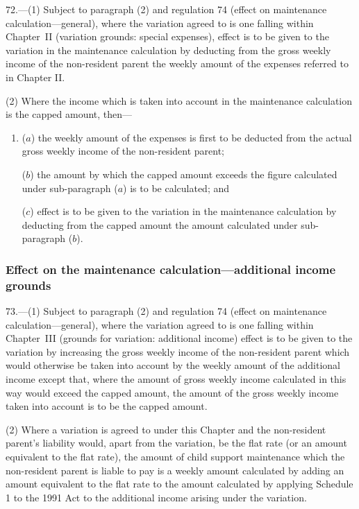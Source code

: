 \documentclass[12pt,a4paper]{article}
\begin{document}
72.---(1)  Subject to paragraph (2) and regulation 74 (effect on maintenance calculation---general), where the variation agreed to is one falling within Chapter~II (variation grounds: special expenses), effect is to be given to the variation in the maintenance calculation by deducting from the gross weekly income of the non-resident parent the weekly amount of the expenses referred to in Chapter II.

(2) Where the income which is taken into account in the maintenance calculation is the capped amount, then—
\begin{enumerate}\item[]
($a$) the weekly amount of the expenses is first to be deducted from the actual gross weekly income of the non-resident parent;

($b$) the amount by which the capped amount exceeds the figure calculated under sub-paragraph ($a$)  is to be calculated; and

($c$) effect is to be given to the variation in the maintenance calculation by deducting from the capped amount the amount calculated under sub-paragraph ($b$).
\end{enumerate}

\subsubsection[73. Effect on the maintenance calculation---additional income grounds]{Effect on the maintenance calculation---additional income grounds}

73.---(1)  Subject to paragraph (2) and regulation 74 (effect on maintenance calculation---general), where the variation agreed to is one falling within Chapter~III (grounds for variation: additional income) effect is to be given to the variation by increasing the gross weekly income of the non-resident parent which would otherwise be taken into account by the weekly amount of the additional income except that, where the amount of gross weekly income calculated in this way would exceed the capped amount, the amount of the gross weekly income taken into account is to be the capped amount.

(2) Where a variation is agreed to under this Chapter and the non-resident parent’s liability would, apart from the variation, be the flat rate (or an amount equivalent to the flat rate), the amount of child support maintenance which the non-resident parent is liable to pay is a weekly amount calculated by adding an amount equivalent to the flat rate to the amount calculated by applying Schedule 1 to the 1991 Act to the additional income arising under the variation.
\end{document}
